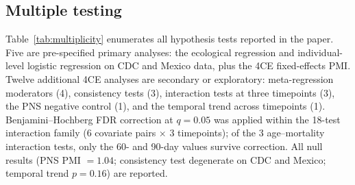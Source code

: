 \documentclass[11pt]{article}
\begin{document}
\subsection{Multiple testing}

Table~\ref{tab:multiplicity} enumerates all hypothesis tests reported in
the paper.  Five are pre-specified primary analyses: the ecological
regression and individual-level logistic regression on CDC and Mexico data,
plus the 4CE fixed-effects PMI.  Twelve additional 4CE analyses are
secondary or exploratory: meta-regression moderators (4), consistency
tests (3), interaction tests at three timepoints (3), the PNS negative
control (1), and the temporal trend across timepoints (1).
Benjamini--Hochberg FDR correction \cite{benjamini1995fdr} at $q = 0.05$ was applied within
the 18-test interaction family (6 covariate pairs $\times$ 3
timepoints); of the 3 age--mortality interaction tests, only the 60-
and 90-day values survive correction.  All null results (PNS PMI
$= 1.04$; consistency test degenerate on CDC and Mexico; temporal trend
$p = 0.16$) are reported.
\end{document}
